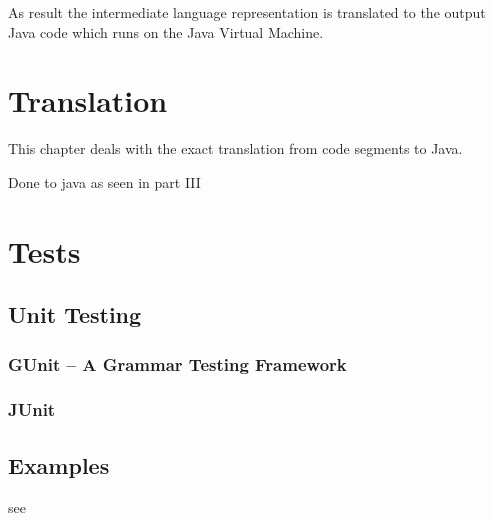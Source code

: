As result the intermediate language representation is translated to the
output Java code which runs on the Java Virtual Machine.

\section{Translation}
\label{ctr:translation}
This chapter deals with the exact translation from \ooplss code segments
to Java.

Done to java as seen in part III


\section{Tests}
\subsection{Unit Testing}
\subsubsection{GUnit -- A Grammar Testing Framework}
\subsubsection{JUnit}

\subsection{Examples}
see 
